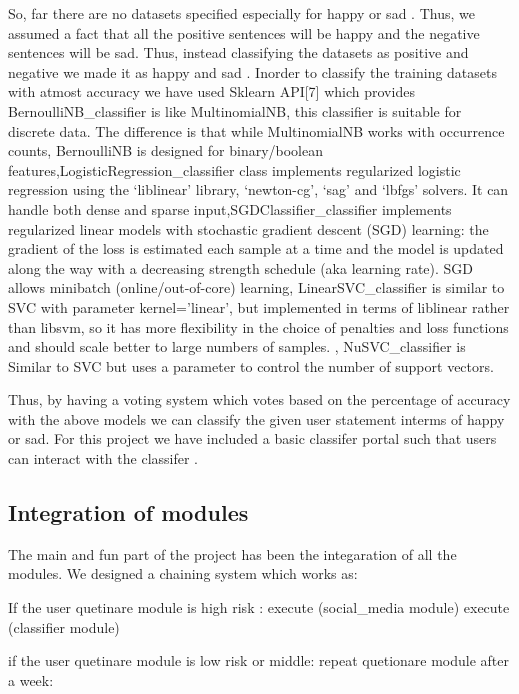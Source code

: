 \documentclass{chi2009}
\begin{document}
\begin{Abstract}
So, far there are no datasets specified especially for happy or sad . Thus, we assumed a fact that all the positive sentences will be happy and the negative sentences will be sad. Thus, instead classifying the datasets as positive and negative we made it as happy and sad . Inorder to classify the training datasets with atmost accuracy we have used Sklearn API[7] which provides BernoulliNB_classifier is like MultinomialNB, this classifier is suitable for discrete data. The difference is that while MultinomialNB works with occurrence counts, BernoulliNB is designed for binary/boolean features,LogisticRegression_classifier class implements regularized logistic regression using the ‘liblinear’ library, ‘newton-cg’, ‘sag’ and ‘lbfgs’ solvers. It can handle both dense and sparse input,SGDClassifier_classifier implements regularized linear models with stochastic gradient descent (SGD) learning: the gradient of the loss is estimated each sample at a time and the model is updated along the way with a decreasing strength schedule (aka learning rate). SGD allows minibatch (online/out-of-core) learning, LinearSVC_classifier is similar to SVC with parameter kernel=’linear’, but implemented in terms of liblinear rather than libsvm, so it has more flexibility in the choice of penalties and loss functions and should scale better to large numbers of samples. , NuSVC_classifier is Similar to SVC but uses a parameter to control the number of support vectors. 


Thus, by having a voting system which votes based on the percentage of accuracy with the above models we can classify the given user statement interms of happy or sad. For this project we have included a basic classifer portal such that users can interact with the classifer .












\subsection{Integration of modules}


The main and fun part of the project has been the integaration of all the modules. We designed a chaining system which works as: 


If the user quetinare module is high risk :
  execute (social_media module)
  execute (classifier module)


if the user quetinare module is low risk or middle:
   repeat quetionare module after a week:
 

\end{Abstract}
\end{document}
